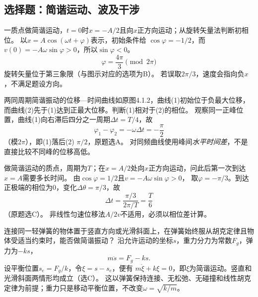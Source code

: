 
\subsection{选择题：简谐运动、波及干涉}

\problemtext 一质点做简谐运动，$t=0$时$x=-A/2$且向$x$正方向运动；从旋转矢量法判断初相位。
\workings
以$x=A\cos(\omega t+\varphi)$表示，初始条件给
$\cos\varphi=-1/2$，而
$v(0)=-A\omega\sin\varphi>0$，所以$\sin\varphi<0$。
\[
\boxed{\varphi=\frac{4\pi}{3}\pmod{2\pi}}
\]
旋转矢量位于第三象限（与图示对应的选项为B）。
\crosscheck 若误取$2\pi/3$，速度会指向负$x$，不满足题设方向。

\problemtext 两同周期简谐振动的位移—时间曲线如原图4.1.2，曲线(1)初始位于负最大位移，而曲线(2)先于(1)达到正最大位移。判断(1)相对于(2)的相位。
\workings
观察同一正峰位置，曲线(1)向右滞后四分之一周期$\Delta t=T/4$，故
\[
\boxed{\varphi_1-\varphi_2=-\omega\Delta t=-\frac{\pi}{2}}
\]
（模$2\pi$），即(1)落后(2) $\pi/2$，原题选A。
\crosscheck 对同频曲线使用峰间\emph{水平时间差}，不是直接比较不同峰的位移高低。

\problemtext 做简谐运动的质点，周期为$T$；在$x=A/2$处向$x$正方向运动，问此后第一次到达$x=A$需要多长时间。
\workings
由$\cos\varphi=1/2$且$v=-A\omega\sin\varphi>0$，
取$\varphi=-\pi/3$。到达正极端的相位为$0$，变化$\Delta\theta=\pi/3$，故
\[
\boxed{\Delta t=\frac{\pi/3}{2\pi/T}=\frac T6}
\]
（原题选C）。
\crosscheck 非线性匀速位移法$A/2v$不适用，必须以相位差计算。

\problemtext 连接同一轻弹簧的物体置于竖直方向或光滑斜面上，在弹簧始终服从胡克定律且物体受适当约束时，能否做简谐振动？
\workings
沿允许运动的坐标$s$，重力分力为常数$F_g$，弹力为$-ks$，
\[
m\ddot s=F_g-ks.
\]
设平衡位置$s_e=F_g/k$，令$\xi=s-s_e$，便有
$m\ddot\xi+k\xi=0$，即$\xi$为简谐运动。竖直和光滑斜面两情形均成立（选C）。
\crosscheck 这以弹簧保持连接、无松弛、无碰撞和线性胡克定律为前提；重力只是移动平衡位置，不改变$\omega=\sqrt{k/m}$。

